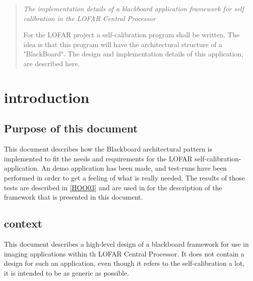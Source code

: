 \documentclass[]{lofar}
\begin{document}
  \maketitle

  \begin{abstract}

    \em{The implementation details of a blackboard application
      framework for self calibration in the LOFAR Central Processor}

    For the LOFAR project a self-calibration program shall be
    written. The idea is that this program will have the architectural
    structure of a "BlackBoard". The design and implementation details
    of this application, are described here.
   
  \end{abstract}

  \tableofcontents

  \listoffigures


  \section{introduction}
  \label{sec:introduction}\hypertarget{sec:introduction}{}

    \subsection{Purpose of this document}
    \label{subsec:purpose}\hypertarget{subsec:purpose}{}

      This document describes how the Blackboard architectural pattern
      is implemented to fit the needs and requirements for the LOFAR
      self-calibration-application. An demo application has been made,
      and test-runs have been performed in order to get a feeling of
      what is really needed. The results of those tests are described
      in \hyperlink{bib:LOFAR-ASTRON-MEM-096}{[HOO03]} and are used in
      for the description of the framework that is presented in this
      document.

    \subsection{context}
    \label{subsec:context}\hypertarget{subsec:context}{}

      This document describes a high-level design of a blackboard
      framework for use in imaging applications within th LOFAR Central
      Processor. It does not contain a design for such an application,
      even though it refers to the self-calibration a lot, it is
      intended to be as generic as possible.
\end{document}
